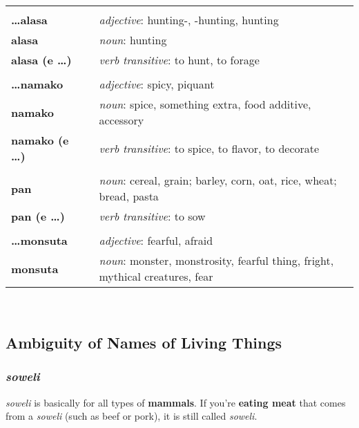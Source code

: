 \begin{supertabular}{p{2,5cm}|ll}
 && \\ %
\textbf{\dots alasa} && \textit{adjective}: hunting-, -hunting, hunting \\ %
\textbf{alasa} && \textit{noun}: hunting \\ %
\textbf{alasa (e \dots)} && \textit{verb transitive}: to hunt, to forage \\ %
 && \\ %
\textbf{\dots namako} && \textit{adjective}: spicy, piquant \\ 
\textbf{namako} && \textit{noun}: spice, something extra, food additive, accessory \\ %
\textbf{namako (e \dots)} && \textit{verb transitive}: to spice, to flavor, to decorate \\ %
 && \\ %
\textbf{pan} && \textit{noun}: cereal, grain; barley, corn, oat, rice, wheat; bread, pasta \\ %
\textbf{pan (e \dots)} && \textit{verb transitive}: to sow \\ %
 && \\ %
\textbf{\dots monsuta} && \textit{adjective}: fearful, afraid \\ %
\textbf{monsuta} && \textit{noun}: monster, monstrosity, fearful thing, fright, mythical creatures, fear \\ %
\end{supertabular} \\
%
\subsection*{Ambiguity of Names of Living Things}
\subsubsection*{\textit{soweli}}
%
\textit{soweli} is basically for all types of \textbf{mammals}. 
If you're \textbf{eating meat} that comes from a \textit{soweli} (such as beef or pork), it is still called \textit{soweli}. 

